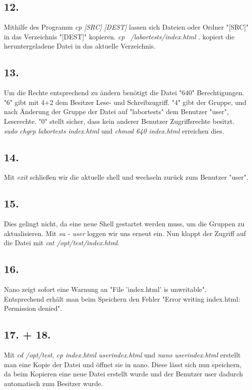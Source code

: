 \documentclass[
    fontsize=10pt,
    headings=medium,
    parskip=half,           %
    bibliography=totoc,
    numbers=noenddot,       %
    open=any,               %
    a4paper,
    ]{scrreprt}
\begin{document}
\subsection*{12.}
Mithilfe des Programm \emph{cp [SRC] [DEST]} lassen sich Dateien oder Ordner "[SRC]" in das Verzeichnis "[DEST]" kopieren. \emph{cp ~/labortests/index.html .} kopiert die heruntergeladene Datei in das aktuelle Verzeichnis.

\subsection*{13.}
Um die Rechte entsprechend zu ändern benötigt die Datei "640" Berechtigungen. "6" gibt mit 4+2 dem Besitzer Lese- und Schreibzugriff. "4" gibt der Gruppe, und nach Änderung der Gruppe der Datei auf "labortests" dem Benutzer "user", Leserechte. "0" stellt sicher, dass kein anderer Benutzer Zugriffsrechte besitzt. \emph{sudo chgrp labortests index.html} und \emph{chmod 640 index.html} erreichen dies.

\subsection*{14.}
Mit \emph{exit} schließen wir die aktuelle shell und wechseln zurück zum Benutzer "user".

\subsection*{15.}
Dies gelingt nicht, da eine neue Shell gestartet werden muss, um die Gruppen zu aktualisieren. Mit \emph{su - user} loggen wir uns erneut ein. Nun klappt der Zugriff auf die Datei mit \emph{cat /opt/test/index.html}.

\subsection*{16.}
Nano zeigt sofort eine Warnung an "File 'index.html' is unwritable". Entsprechend erhält man beim Speichern den Fehler "Error writing index.html: Permission denied".

\subsection*{17. + 18.}
Mit \emph{cd /opt/test}, \emph{cp index.html userindex.html} und \emph{nano userindex.html} erstellt man eine Kopie der Datei und öffnet sie in nano. Diese lässt sich nun speichern, da beim Kopieren eine neue Datei erstellt wurde und der Benutzer user dadurch automatisch zum Besitzer wurde.
\end{document}
